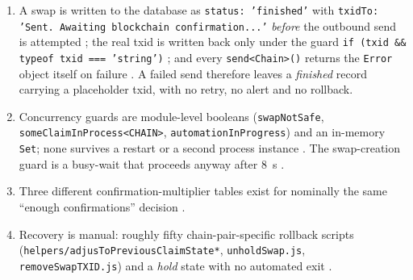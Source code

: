 \begin{enumerate}
\item A swap is written to the database as \texttt{status:\allowbreak{} 'finished'} with
      \texttt{txidTo: 'Sent.\allowbreak{} Awaiting blockchain confirmation.\allowbreak{}.\allowbreak{}.\allowbreak{}'} \emph{before} the outbound send is
      attempted ; the real txid is written back
      only under the guard \texttt{if (txid \&\& typeof txid === 'string')}
      ; and every \texttt{send<Chain>()}
      returns the \texttt{Error} object itself on failure
      . A failed send therefore leaves a
      \textit{finished} record carrying a placeholder txid, with no retry, no alert and no rollback.
\item Concurrency guards are module-level booleans (\texttt{swapNotSafe},
      \texttt{some\allowbreak{}Claim\allowbreak{}In\allowbreak{}Process<CHAIN>}, \texttt{automation\allowbreak{}In\allowbreak{}Progress}) and an in-memory
      \texttt{Set}; none survives a restart or a second process instance
      . The swap-creation guard is a
      busy-wait that proceeds anyway after \SI{8}{\second}
      .
\item Three different confirmation-multiplier tables exist for nominally the same ``enough
      confirmations'' decision 
      .
\item Recovery is manual: roughly fifty chain-pair-specific rollback scripts
      (\texttt{helpers/\allowbreak{}adjusToPreviousClaimState*}, \texttt{unholdSwap.js},
      \texttt{remove\allowbreak{}Swap\allowbreak{}TXID.\allowbreak{}js}) and a \textit{hold} state with no automated exit
      .
\end{enumerate}


